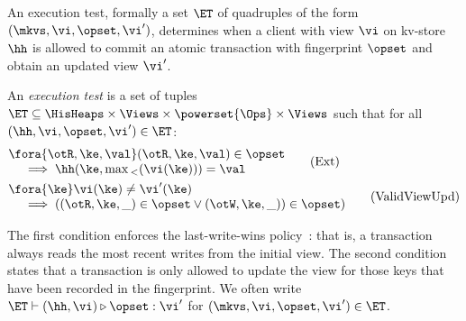 An execution test, formally a set $\ET$ of quadruples of the form $(\mkvs, \vi, \opset, \vi')$,
determines when a client with view $\vi$ on kv-store $\hh$ 
is allowed to commit an atomic  transaction with fingerprint
$\opset$  and obtain an updated view $\vi'$. 


\begin{definition}
\label{def:execution.test}
An \emph{execution test} is a set of tuples $\ET \subseteq \HisHeaps \times \Views \times \powerset{\Ops} \times \Views$ 
such that for all $(\hh, \vi, \opset, \vi') \in \ET$:
\begin{align}
    & 
    \begin{array}{@{}l@{}}
    \fora{\otR, \ke, \val} (\otR, \ke, \val) \in \opset \\
    \quad {} \implies 
    \hh(\ke, \max{}_{<}(\vi(\ke))) = \val  
    \end{array}
    \tag{Ext} \label{eq:read-external} \\
    & 
    \begin{array}{@{}l@{}}
    \fora{\ke} \vi(\ke) \neq \vi'(\ke) \\
    \quad {} \implies
    ( (\otR, \ke, \_) \in \opset \vee (\otW, \ke, \_)) \in \opset) 
    \end{array}
    \tag{ValidViewUpd} \label{eq:valid-view-update}
\end{align}
\end{definition}

\noindent 
The first condition enforces the last-write-wins policy~\cite{}: that
is, a transaction always reads the most recent writes from the initial
view.  The second condition states that a transaction is only allowed
to update the view for those keys that have been recorded in the
fingerprint.  We often write
$\ET \vdash (\hh, \vi) \triangleright \opset: \vi'$ for
$(\mkvs, \vi, \opset, \vi') \in \ET$.




